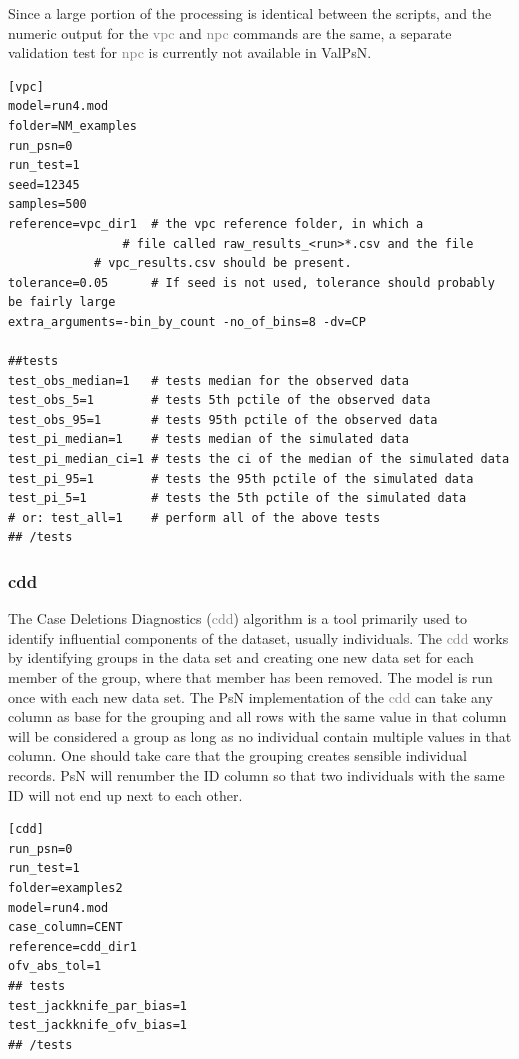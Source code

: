 \documentclass[a4,11pt]{report} \usepackage[pdftex]{graphicx}
\newcommand{\psn}[1]{\textcolor{Grey}{#1}}
\begin{document}
\noindent Since a large portion of the processing is
identical between the scripts, and the numeric output for the
\psn{vpc} and \psn{npc} commands are the same, a separate validation
test for \psn{npc} is currently not available in ValPsN.

\begin{lstlisting}
[vpc]
model=run4.mod
folder=NM_examples
run_psn=0
run_test=1
seed=12345
samples=500
reference=vpc_dir1  # the vpc reference folder, in which a
	            # file called raw_results_<run>*.csv and the file
		    # vpc_results.csv should be present.
tolerance=0.05      # If seed is not used, tolerance should probably be fairly large
extra_arguments=-bin_by_count -no_of_bins=8 -dv=CP

##tests
test_obs_median=1   # tests median for the observed data
test_obs_5=1        # tests 5th pctile of the observed data
test_obs_95=1       # tests 95th pctile of the observed data
test_pi_median=1    # tests median of the simulated data
test_pi_median_ci=1 # tests the ci of the median of the simulated data
test_pi_95=1        # tests the 95th pctile of the simulated data
test_pi_5=1         # tests the 5th pctile of the simulated data
# or: test_all=1    # perform all of the above tests
## /tests
\end{lstlisting}

\subsubsection{cdd}
The Case Deletions Diagnostics (\psn{cdd}) algorithm is a tool
primarily used to identify influential components of the dataset,
usually individuals. The \psn{cdd} works by identifying groups in the
data set and creating one new data set for each member of the group,
where that member has been removed.  The model is run once with each
new data set. The PsN implementation of the \psn{cdd} can take any
column as base for the grouping and all rows with the same value in
that column will be considered a group as long as no individual
contain multiple values in that column. One should take care that the
grouping creates sensible individual records. PsN will renumber the ID
column so that two individuals with the same ID will not end up next
to each other.

\begin{lstlisting}
[cdd]
run_psn=0
run_test=1
folder=examples2
model=run4.mod
case_column=CENT
reference=cdd_dir1
ofv_abs_tol=1
## tests
test_jackknife_par_bias=1
test_jackknife_ofv_bias=1
## /tests
\end{lstlisting}
\end{document}
